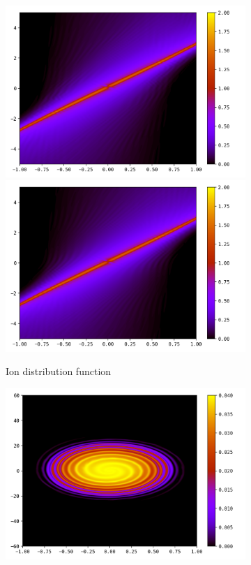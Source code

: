 \documentclass{article}
\numberwithin{equation}{section}
\newcommand{\imh}{\textheight} %
\newcommand{\imw}{\textwidth} %
\begin{document}
\begin{figure}
	\begin{subfigure}{\textwidth}
		\centering
		\includegraphics[height=\imh,width=\imw]{images/fiT20_run5af.png}
		\includegraphics[height=\imh,width=\imw]{images/fiT20_run5af_2.png}
		\caption{Ion distribution function} 
	\end{subfigure}
	\begin{subfigure}{\textwidth}
		\centering
		\includegraphics[height=\imh,width=\imw]{images/feT20_run5af.png}

\end{subfigure}
\end{figure}
\end{document}

